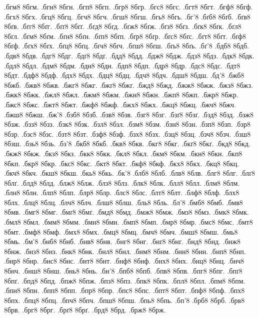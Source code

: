 {.бгм8
8бгм.
.бгн8
8бгн.
.бгп8
8бгп.
.бгр8
8бгр.
.бгс8
8бгс.
.бгт8
8бгт.
.бгф8
8бгф.
.бгх8
8бгх.
.бгц8
8бгц.
.бгч8
8бгч.
.бгш8
8бгш.
.бгь8
8бгь.
.бг'8
.бґб8
8бґб.
.бґв8
8бґв.
.бґг8
8бґг.
.бґґ8
8бґґ.
.бґд8
8бґд.
.бґж8
8бґж.
.бґз8
8бґз.
.бґк8
8бґк.
.бґл8
8бґл.
.бґм8
8бґм.
.бґн8
8бґн.
.бґп8
8бґп.
.бґр8
8бґр.
.бґс8
8бґс.
.бґт8
8бґт.
.бґф8
8бґф.
.бґх8
8бґх.
.бґц8
8бґц.
.бґч8
8бґч.
.бґш8
8бґш.
.бґь8
8бґь.
.бґ'8
.бдб8
8бдб.
.бдв8
8бдв.
.бдг8
8бдг.
.бдґ8
8бдґ.
.бдд8
8бдд.
.бдж8
8бдж.
.бдз8
8бдз.
.бдк8
8бдк.
.бдл8
8бдл.
.бдм8
8бдм.
.бдн8
8бдн.
.бдп8
8бдп.
.бдр8
8бдр.
.бдс8
8бдс.
.бдт8
8бдт.
.бдф8
8бдф.
.бдх8
8бдх.
.бдц8
8бдц.
.бдч8
8бдч.
.бдш8
8бдш.
.бд'8
.бжб8
8бжб.
.бжв8
8бжв.
.бжг8
8бжг.
.бжґ8
8бжґ.
.бжд8
8бжд.
.бжж8
8бжж.
.бжз8
8бжз.
.бжк8
8бжк.
.бжл8
8бжл.
.бжм8
8бжм.
.бжн8
8бжн.
.бжп8
8бжп.
.бжр8
8бжр.
.бжс8
8бжс.
.бжт8
8бжт.
.бжф8
8бжф.
.бжх8
8бжх.
.бжц8
8бжц.
.бжч8
8бжч.
.бжш8
8бжш.
.бж'8
.бзб8
8бзб.
.бзв8
8бзв.
.бзг8
8бзг.
.бзґ8
8бзґ.
.бзд8
8бзд.
.бзж8
8бзж.
.бзз8
8бзз.
.бзк8
8бзк.
.бзл8
8бзл.
.бзм8
8бзм.
.бзн8
8бзн.
.бзп8
8бзп.
.бзр8
8бзр.
.бзс8
8бзс.
.бзт8
8бзт.
.бзф8
8бзф.
.бзх8
8бзх.
.бзц8
8бзц.
.бзч8
8бзч.
.бзш8
8бзш.
.бзь8
8бзь.
.бз'8
.бкб8
8бкб.
.бкв8
8бкв.
.бкг8
8бкг.
.бкґ8
8бкґ.
.бкд8
8бкд.
.бкж8
8бкж.
.бкз8
8бкз.
.бкк8
8бкк.
.бкл8
8бкл.
.бкм8
8бкм.
.бкн8
8бкн.
.бкп8
8бкп.
.бкр8
8бкр.
.бкс8
8бкс.
.бкт8
8бкт.
.бкф8
8бкф.
.бкх8
8бкх.
.бкц8
8бкц.
.бкч8
8бкч.
.бкш8
8бкш.
.бкь8
8бкь.
.бк'8
.блб8
8блб.
.блв8
8блв.
.блг8
8блг.
.блґ8
8блґ.
.блд8
8блд.
.блж8
8блж.
.блз8
8блз.
.блк8
8блк.
.блл8
8блл.
.блм8
8блм.
.блн8
8блн.
.блп8
8блп.
.блр8
8блр.
.блс8
8блс.
.блт8
8блт.
.блф8
8блф.
.блх8
8блх.
.блц8
8блц.
.блч8
8блч.
.блш8
8блш.
.бль8
8бль.
.бл'8
.бмб8
8бмб.
.бмв8
8бмв.
.бмг8
8бмг.
.бмґ8
8бмґ.
.бмд8
8бмд.
.бмж8
8бмж.
.бмз8
8бмз.
.бмк8
8бмк.
.бмл8
8бмл.
.бмм8
8бмм.
.бмн8
8бмн.
.бмп8
8бмп.
.бмр8
8бмр.
.бмс8
8бмс.
.бмт8
8бмт.
.бмф8
8бмф.
.бмх8
8бмх.
.бмц8
8бмц.
.бмч8
8бмч.
.бмш8
8бмш.
.бмь8
8бмь.
.бм'8
.бнб8
8бнб.
.бнв8
8бнв.
.бнг8
8бнг.
.бнґ8
8бнґ.
.бнд8
8бнд.
.бнж8
8бнж.
.бнз8
8бнз.
.бнк8
8бнк.
.бнл8
8бнл.
.бнм8
8бнм.
.бнн8
8бнн.
.бнп8
8бнп.
.бнр8
8бнр.
.бнс8
8бнс.
.бнт8
8бнт.
.бнф8
8бнф.
.бнх8
8бнх.
.бнц8
8бнц.
.бнч8
8бнч.
.бнш8
8бнш.
.бнь8
8бнь.
.бн'8
.бпб8
8бпб.
.бпв8
8бпв.
.бпг8
8бпг.
.бпґ8
8бпґ.
.бпд8
8бпд.
.бпж8
8бпж.
.бпз8
8бпз.
.бпк8
8бпк.
.бпл8
8бпл.
.бпм8
8бпм.
.бпн8
8бпн.
.бпп8
8бпп.
.бпр8
8бпр.
.бпс8
8бпс.
.бпт8
8бпт.
.бпф8
8бпф.
.бпх8
8бпх.
.бпц8
8бпц.
.бпч8
8бпч.
.бпш8
8бпш.
.бпь8
8бпь.
.бп'8
.брб8
8брб.
.брв8
8брв.
.брг8
8брг.
.брґ8
8брґ.
.брд8
8брд.
.брж8
8брж.
}
